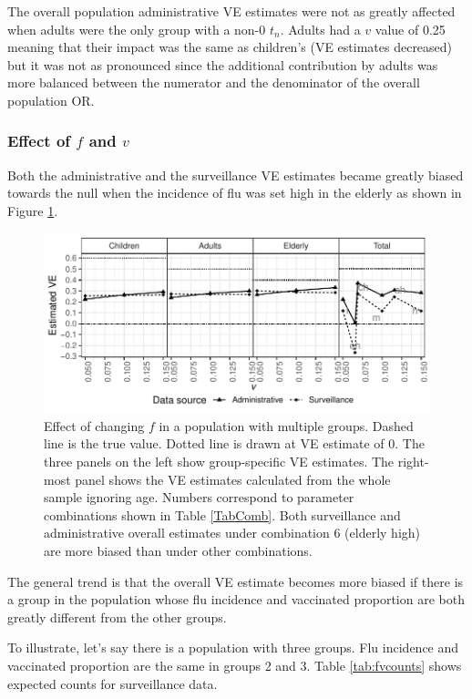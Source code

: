 \documentclass[11pt]{article}
\begin{document}
The overall population administrative VE estimates were not as greatly affected when adults were the only group with a non-0 $t_n$. Adults had a $v$ value of 0.25 meaning that their impact was the same as children's (VE estimates decreased) but it was not as pronounced since the additional contribution by adults was more balanced between the numerator and the denominator of the overall population OR.

\pagebreak
\subsubsection{Effect of $f$ and $v$}

Both the administrative and the surveillance VE estimates became greatly biased towards the null when the incidence of flu was set high in the elderly as shown in Figure \ref{fig:agesmult-pflu}.

\begin{figure}[h]
	\centering
		\includegraphics[width=1\linewidth]{../fig-agesmult/agesmult-pflu.pdf}
		\caption{
Effect of changing $f$ in a population with multiple groups. Dashed line is the true value. Dotted line is drawn at VE estimate of 0. The three panels on the left show group-specific VE estimates. The right-most panel shows the VE estimates calculated from the whole sample ignoring age. Numbers correspond to parameter combinations shown in Table \ref{TabComb}. Both surveillance and administrative overall estimates under combination 6 (elderly high) are more biased than under other combinations. \label{fig:agesmult-pflu}
		}
\end{figure}

The general trend is that the overall VE estimate becomes more biased if there is a group in the population whose flu incidence and vaccinated proportion are both greatly different from the other groups.

To illustrate, let's say there is a population with three groups. Flu incidence and vaccinated proportion are the same in groups 2 and 3. Table \ref{tab:fvcounts} shows expected counts for surveillance data. 
\end{document}
